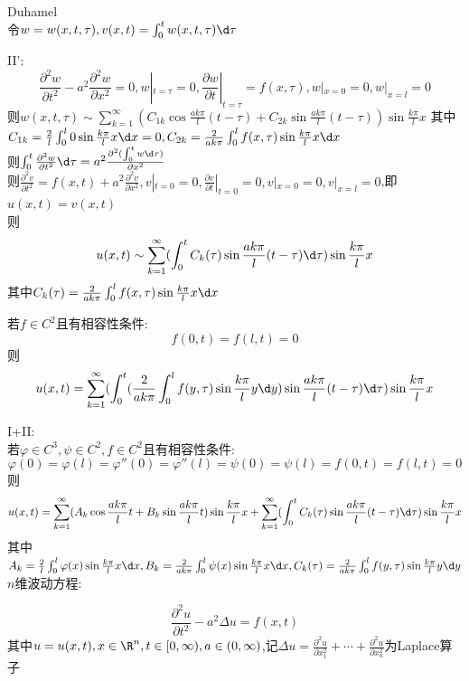 \begin{jie}Duhamel\\
令$w=w(x,t,\tau),v(x,t)=\int_{0}^{t}w(x,t,\tau)\d\tau$

\rm{II}':
\[\frac{\partial^2w}{\partial t^2}-a^2\frac{\partial^2w}{\partial x^2}=0,w|_{t=\tau}=0,\frac{\partial w}{\partial t}|_{t=\tau}=f(x,\tau ),w|_{x=0}=0,w|_{x=l}=0\]
则$w(x,t,\tau)\sim \sum\limits_{k=1}^{\infty}(C_{1k}\cos\frac{ak\pi}{l}(t-\tau)+C_{2k}\sin\frac{ak\pi}{l}(t-\tau))\sin\frac{k\pi}{l}x$
其中$C_{1k}=\frac{2}{l}\int_{0}^{l}0\sin\frac{k\pi}{l}x\d x=0,C_{2k}=\frac{2}{ak\pi}\int_{0}^{l}f(x,\tau)\sin\frac{k\pi}{l}x\d x$\\
则$\int_{0}^{t}\frac{\partial^2w}{\partial t^2}\d\tau=a^2\frac{\partial^2(\int_{0}^{t}w\d\tau)}{\partial x^2}$\\
则$\frac{\partial^2 v}{\partial t^2}=f(x,t)+a^2\frac{\partial^2v}{\partial x^2},v|_{t=0}=0,\frac{\partial v}{\partial t}|_{t=0}=0,v|_{x=0}=0,v|_{x=l}=0$,即$u(x,t)=v(x,t)$\\
则\[u(x,t)\sim \sum\limits_{k=1}^{\infty}(\int_{0}^{t}C_{k}(\tau)\sin\frac{ak\pi}{l}(t-\tau)\d\tau)\sin\frac{k\pi}{l}x\]
其中$C_{k}(\tau)=\frac{2}{ak\pi}\int_{0}^{l}f(x,\tau)\sin\frac{k\pi}{l}x\d x$
\end{jie}

\begin{dingli*}
若$f\in C^2$且有相容性条件:
\[f(0,t)=f(l,t)=0\]
则\[u(x,t)=\sum\limits_{k=1}^{\infty}(\int_{0}^{t}(\frac{2}{ak\pi}\int_{0}^{l}f(y,\tau)\sin\frac{k\pi}{l}y\d y)\sin\frac{ak\pi}{l}(t-\tau)\d\tau)\sin\frac{k\pi}{l}x\]
\end{dingli*}

I+II:\\
若$\varphi\in C^3,\psi\in C^2,f\in C^2$且有相容性条件:
\[\varphi(0)=\varphi(l)=\varphi''(0)=\varphi''(l)=\psi(0)=\psi(l)=f(0,t)=f(l,t)=0\]
则\[u(x,t)=\sum\limits_{k=1}^{\infty}(A_k\cos\frac{ak\pi}{l}t+B_{k}\sin\frac{ak\pi}{l}t)\sin\frac{k\pi}{l}x+\sum\limits_{k=1}^{\infty}(\int_{0}^{t}C_{k}(\tau)\sin\frac{ak\pi}{l}(t-\tau)\d\tau)\sin\frac{k\pi}{l}x\]
其中$A_{k}=\frac{2}{l}\int_{0}^{l}\varphi(x)\sin\frac{k\pi}{l}x\d x,B_{k}=\frac{2}{ak\pi}\int_{0}^{l}\psi(x)\sin\frac{k\pi}{l}x\d x,C_{k}(\tau)=\frac{2}{ak\pi}\int_{0}^{l}f(y,\tau)\sin\frac{k\pi}{l}y\d y$\\

$n$维波动方程:

\[\frac{\partial^2 u}{\partial t^2}-a^2\Delta u=f(x,t)\]
其中$u=u(x,t),x\in\R^n,t\in [0,\infty),a\in(0,\infty)$,记$\Delta u=\frac{\partial^2u}{\partial x_1^2}+\cdots+\frac{\partial^2u}{\partial x_n^2}$为Laplace算子\\

